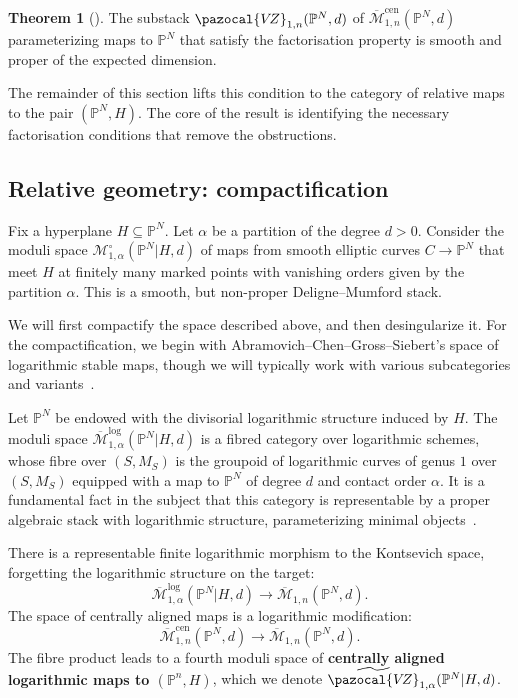 \documentclass[11pt]{amsart}
\newcommand{\PP}{\mathbb P}
\newcommand{\VZ}{\pazocal{V\!Z}}
\renewcommand{\to}{\rightarrow}
\theoremstyle{definition}
\newtheorem{thm}{Theorem}[section]
\theoremstyle{definition}
\begin{document}
 
\begin{thm}[{\cite[Theorem B]{RSPW}}]
The substack $\VZ_{1,n}(\mathbb P^N,d)$ of $\overline{\mathcal M}^{\mathrm{cen}}_{1,n}(\mathbb P^N,d)$ parameterizing maps to $\mathbb P^N$ that satisfy the factorisation property is smooth and proper of the expected dimension.
\end{thm}

The remainder of this section lifts this condition to the category of relative maps to the pair $(\mathbb P^N,H)$. The core of the result is identifying the necessary factorisation conditions that remove the obstructions. 

\subsection{Relative geometry: compactification} Fix a hyperplane $H\subseteq \mathbb P^N$. Let $\alpha$ be a partition of the degree $d>0$. Consider the moduli space $\mathcal M_{1,\alpha}^\circ(\mathbb P^N|H,d)$ of maps from smooth elliptic curves $C\to \mathbb P^N$ that meet $H$ at finitely many marked points with vanishing orders given by the partition $\alpha$. This is a smooth, but non-proper Deligne--Mumford stack. 

We will first compactify the space described above, and then desingularize it. For the compactification, we begin with Abramovich--Chen--Gross--Siebert's space of logarithmic stable maps, though we will typically work with various subcategories and variants~\cite{AbramovichChenLog,ChenLog,GrossSiebertLog,KimLog}.

Let $\PP^N$ be endowed with the divisorial logarithmic structure induced by $H$. The moduli space $\overline{\mathcal{M}}^{\operatorname{log}}_{1,\alpha}(\mathbb P^N|H,d)$ is a fibred category over logarithmic schemes, whose fibre over $(S,M_S)$ is the groupoid of logarithmic curves of genus $1$ over $(S,M_S)$ equipped with a map to $\mathbb P^N$ of degree $d$ and contact order $\alpha$. It is a fundamental fact in the subject that this category is representable by a proper algebraic stack with logarithmic structure, parameterizing minimal objects~\cite{ChenLog}. 

There is a representable finite logarithmic morphism to the Kontsevich space, forgetting the logarithmic structure on the target:
$$
\overline{\mathcal M}^{\mathrm{log}}_{1,\alpha}(\mathbb P^N|H,d) \to \overline{\mathcal M}_{1,n}(\mathbb P^N,d).
$$
The space of centrally aligned maps is a logarithmic modification:
$$
\overline{\mathcal M}^{\mathrm{cen}}_{1,n}(\mathbb P^N,d)\to\overline{ \mathcal M}_{1,n}(\mathbb P^N,d).
$$ 
The fibre product leads to a fourth moduli space of \textbf{centrally aligned logarithmic maps to $(\mathbb P^n,H)$}, which we denote $\widetilde{\VZ}_{1,\alpha}(\mathbb P^N|H,d)$.
\end{document}
